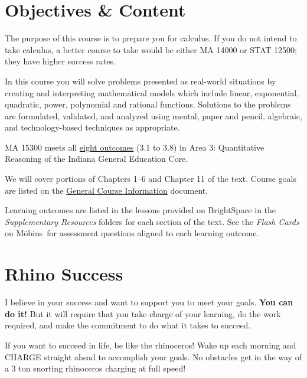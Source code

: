 \documentclass[letterpaper,twoside]{article}
\def\Mobius{M\"obius\ }
\begin{document}
\begin{multicols*}{2}
    \section*{Objectives \& Content}

    The purpose of this course is to prepare you for calculus.
    If you do not intend to take calculus, a better course to take would be either MA 14000 or STAT 12500; they have higher success rates.

    In this course you will solve problems presented as real-world situations by creating and interpreting mathematical models which include linear, exponential, quadratic, power, polynomial and rational functions.
    Solutions to the problems are formulated, validated, and analyzed using mental, paper and pencil, algebraic, and technology-based techniques as appropriate.

    MA 15300 meets all \href{https://transferin.net/ways-to-earn-credit/statewide-transfer-general-education-core-stgec/}{eight outcomes} (3.1 to 3.8) in Area 3: Quantitative Reasoning of the Indiana General Education Core.

    We will cover portions of Chapters 1--6 and Chapter 11 of the text.
    Course goals are listed on the \href{https://users.pfw.edu/lamaster/ma153/GeneralCourseInformationMA15300MA15400.pdf}{General Course Information} document.

    Learning outcomes are listed in the lessons provided on BrightSpace in the \textit{Supplementary Resources} folders for each section of the text.
    See the \textit{Flash Cards} on \Mobius for assessment questions aligned to each learning outcome.

    \section*{Rhino Success}


    I believe in your success and want to support you to meet your goals.
    \textbf{You can do it!}
    But it will require that you take charge of your learning, do the work required, and make the commitment to do what it takes to succeed.

    If you want to succeed in life, be like the rhinoceros!
    Wake up each morning and CHARGE straight ahead to accomplish your goals.
    No obstacles get in the way of a 3 ton snorting rhinoceros charging at full speed!


\end{multicols*}
\end{document}
